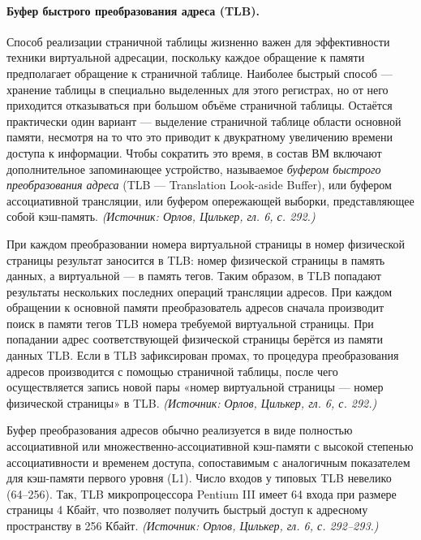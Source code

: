 \documentclass[a4paper,12pt]{article}
\begin{document}
\paragraph{Буфер быстрого преобразования адреса (TLB).}
Способ реализации страничной таблицы жизненно важен для эффективности техники виртуальной адресации, поскольку каждое обращение к памяти предполагает обращение к страничной таблице. Наиболее быстрый способ --- хранение таблицы в специально выделенных для этого регистрах, но от него приходится отказываться при большом объёме страничной таблицы. Остаётся практически один вариант --- выделение страничной таблице области основной памяти, несмотря на то что это приводит к двукратному увеличению времени доступа к информации. Чтобы сократить это время, в состав ВМ включают дополнительное запоминающее устройство, называемое \emph{буфером быстрого преобразования адреса} (TLB --- Translation Look-aside Buffer), или буфером ассоциативной трансляции, или буфером опережающей выборки, представляющее собой кэш-память.
\textit{(Источник: Орлов, Цилькер, гл. 6, с. 292.)}

При каждом преобразовании номера виртуальной страницы в номер физической страницы результат заносится в TLB: номер физической страницы в память данных, а виртуальной --- в память тегов. Таким образом, в TLB попадают результаты нескольких последних операций трансляции адресов. При каждом обращении к основной памяти преобразователь адресов сначала производит поиск в памяти тегов TLB номера требуемой виртуальной страницы. При попадании адрес соответствующей физической страницы берётся из памяти данных TLB. Если в TLB зафиксирован промах, то процедура преобразования адресов производится с помощью страничной таблицы, после чего осуществляется запись новой пары «номер виртуальной страницы --- номер физической страницы» в TLB.
\textit{(Источник: Орлов, Цилькер, гл. 6, с. 292.)}

Буфер преобразования адресов обычно реализуется в виде полностью ассоциативной или множественно-ассоциативной кэш-памяти с высокой степенью ассоциативности и временем доступа, сопоставимым с аналогичным показателем для кэш-памяти первого уровня (L1). Число входов у типовых TLB невелико (64--256). Так, TLB микропроцессора Pentium III имеет 64 входа при размере страницы 4 Кбайт, что позволяет получить быстрый доступ к адресному пространству в 256 Кбайт.
\textit{(Источник: Орлов, Цилькер, гл. 6, с. 292--293.)}
\end{document}
